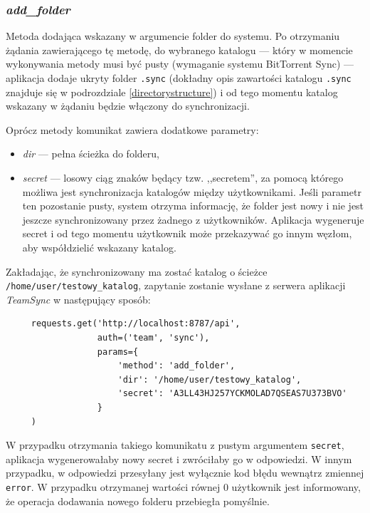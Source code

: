 \documentclass[polish,a4paper,twoside]{ppfcmthesis}
\begin{document}
\subsubsection*{\emph{add\_folder}}

Metoda dodająca wskazany w argumencie folder do systemu. Po otrzymaniu żądania zawierającego tę metodę, do wybranego katalogu --- który w momencie wykonywania metody musi być pusty (wymaganie systemu BitTorrent Sync) --- aplikacja dodaje ukryty folder \texttt{.sync} (dokładny opis zawartości katalogu \texttt{.sync} znajduje się w podrozdziale \ref{directorystructure}) i od tego momentu katalog wskazany w żądaniu będzie włączony do synchronizacji.

Oprócz metody komunikat zawiera dodatkowe parametry:

\begin{itemize}[noitemsep]
  \item \emph{dir} --- pełna ścieżka do folderu,
  \item \emph{secret} --- losowy ciąg znaków będący tzw. ,,secretem'', za pomocą którego możliwa jest synchronizacja katalogów między użytkownikami. Jeśli parametr ten pozostanie pusty, system otrzyma informację, że folder jest nowy i nie jest jeszcze synchronizowany przez żadnego z użytkowników. Aplikacja wygeneruje secret i od tego momentu użytkownik może przekazywać go innym węzłom, aby współdzielić wskazany katalog.
\end{itemize}

Zakładając, że synchronizowany ma zostać katalog o ścieżce \texttt{/home/user/testowy\_katalog}, zapytanie zostanie wysłane z serwera aplikacji \emph{TeamSync} w następujący sposób:

\begin{minipage}{\linewidth}
\vspace{15pt}
\begin{verbatim}
     requests.get('http://localhost:8787/api',
                  auth=('team', 'sync'),
                  params={
                      'method': 'add_folder',
                      'dir': '/home/user/testowy_katalog',
                      'secret': 'A3LL43HJ257YCKMOLAD7QSEAS7U373BVO'
                  }
     )
\end{verbatim}
\vspace{15pt}
\end{minipage}

W przypadku otrzymania takiego komunikatu z pustym argumentem \texttt{secret}, aplikacja wygenerowałaby nowy secret i zwróciłaby go w odpowiedzi. W innym przypadku, w odpowiedzi przesyłany jest wyłącznie kod błędu wewnątrz zmiennej \texttt{error}. W przypadku otrzymanej wartości równej $0$ użytkownik jest informowany, że operacja dodawania nowego folderu przebiegła pomyślnie.
\end{document}
